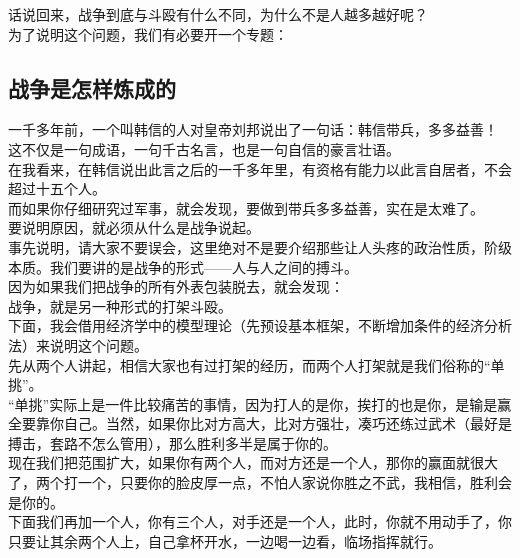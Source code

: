 \begin{multicols}{\theparacolNo}
话说回来，战争到底与斗殴有什么不同，为什么不是人越多越好呢？\\

为了说明这个问题，我们有必要开一个专题：\\

\subsection{战争是怎样炼成的}
一千多年前，一个叫韩信的人对皇帝刘邦说出了一句话：韩信带兵，多多益善！\\

这不仅是一句成语，一句千古名言，也是一句自信的豪言壮语。\\

在我看来，在韩信说出此言之后的一千多年里，有资格有能力以此言自居者，不会超过十五个人。\\

而如果你仔细研究过军事，就会发现，要做到带兵多多益善，实在是太难了。\\

要说明原因，就必须从什么是战争说起。\\

事先说明，请大家不要误会，这里绝对不是要介绍那些让人头疼的政治性质，阶级本质。我们要讲的是战争的形式——人与人之间的搏斗。\\

因为如果我们把战争的所有外表包装脱去，就会发现：\\

战争，就是另一种形式的打架斗殴。\\

下面，我会借用经济学中的模型理论（先预设基本框架，不断增加条件的经济分析法）来说明这个问题。\\

先从两个人讲起，相信大家也有过打架的经历，而两个人打架就是我们俗称的“单挑”。\\

“单挑”实际上是一件比较痛苦的事情，因为打人的是你，挨打的也是你，是输是赢全要靠你自己。当然，如果你比对方高大，比对方强壮，凑巧还练过武术（最好是搏击，套路不怎么管用），那么胜利多半是属于你的。\\

现在我们把范围扩大，如果你有两个人，而对方还是一个人，那你的赢面就很大了，两个打一个，只要你的脸皮厚一点，不怕人家说你胜之不武，我相信，胜利会是你的。\\

下面我们再加一个人，你有三个人，对手还是一个人，此时，你就不用动手了，你只要让其余两个人上，自己拿杯开水，一边喝一边看，临场指挥就行。\\


\end{multicols}
